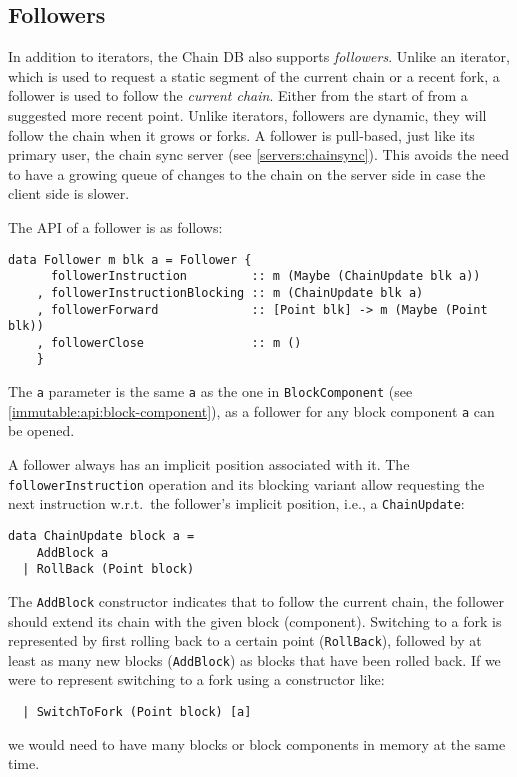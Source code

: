 \subsection{Followers}
\label{chaindb:union:followers}

In addition to iterators, the Chain DB also supports \emph{followers}. Unlike an
iterator, which is used to request a static segment of the current chain or a
recent fork, a follower is used to follow the \emph{current chain}. Either from
the start of from a suggested more recent point. Unlike iterators, followers are
dynamic, they will follow the chain when it grows or forks. A follower is
pull-based, just like its primary user, the chain sync server (see
\cref{servers:chainsync}). This avoids the need to have a growing queue of
changes to the chain on the server side in case the client side is slower.

The API of a follower is as follows:
%
\begin{lstlisting}
data Follower m blk a = Follower {
      followerInstruction         :: m (Maybe (ChainUpdate blk a))
    , followerInstructionBlocking :: m (ChainUpdate blk a)
    , followerForward             :: [Point blk] -> m (Maybe (Point blk))
    , followerClose               :: m ()
    }
\end{lstlisting}
%
The \lstinline!a! parameter is the same \lstinline!a! as the one in
\lstinline!BlockComponent! (see \cref{immutable:api:block-component}), as a
follower for any block component \lstinline!a! can be opened.

A follower always has an implicit position associated with it. The
\lstinline!followerInstruction! operation and its blocking variant allow
requesting the next instruction w.r.t.\ the follower's implicit position, i.e.,
a \lstinline!ChainUpdate!:
%
\begin{lstlisting}
data ChainUpdate block a =
    AddBlock a
  | RollBack (Point block)
\end{lstlisting}
%
The \lstinline!AddBlock! constructor indicates that to follow the current chain,
the follower should extend its chain with the given block (component). Switching
to a fork is represented by first rolling back to a certain point
(\lstinline!RollBack!), followed by at least as many new blocks
(\lstinline!AddBlock!) as blocks that have been rolled back. If we were to
represent switching to a fork using a constructor like:
%
\begin{lstlisting}
  | SwitchToFork (Point block) [a]
\end{lstlisting}
%
we would need to have many blocks or block components in memory at the same
time.

